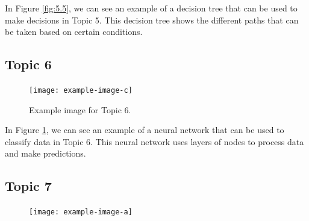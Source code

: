 \documentclass{article}
\begin{document}
In Figure \ref{fig:5.5}, we can see an example of a decision tree that can be used to make decisions in Topic 5. This decision tree shows the different paths that can be taken based on certain conditions.

\subsection{Topic 6}

\begin{figure}[ht]
  \centering
  \texttt{[image: example-image-c]}
  \caption{Example image for Topic 6.}
  \label{fig:topic6}
\end{figure}

In Figure \ref{fig:topic6}, we can see an example of a neural network that can be used to classify data in Topic 6. This neural network uses layers of nodes to process data and make predictions.

\subsection{Topic 7}

\begin{figure}[ht]
  \centering
  \texttt{[image: example-image-a]}
\end{figure}
\end{document}
